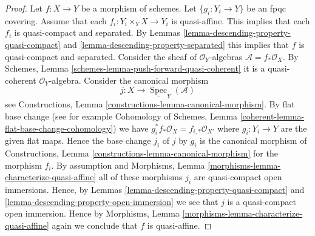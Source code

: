 \documentclass{stacks-project}
\theoremstyle{plain}
\theoremstyle{definition}
\theoremstyle{remark}
\numberwithin{equation}{subsection}
\def\Spec{\mathop{\mathrm{Spec}}}
\begin{document}
\begin{proof}
Let $f : X \to Y$ be a morphism of schemes.
Let $\{g_i : Y_i \to Y\}$ be an fpqc covering.
Assume that each $f_i : Y_i \times_Y X \to Y_i$
is quasi-affine.
This implies that each $f_i$ is quasi-compact and separated.
By Lemmas \ref{lemma-descending-property-quasi-compact}
and \ref{lemma-descending-property-separated}
this implies that $f$ is quasi-compact and separated.
Consider the sheaf of $\mathcal{O}_Y$-algebras
$\mathcal{A} = f_*\mathcal{O}_X$.
By Schemes, Lemma \ref{schemes-lemma-push-forward-quasi-coherent}
it is a quasi-coherent $\mathcal{O}_Y$-algebra.
Consider the canonical morphism
$$
j : X \longrightarrow \underline{\Spec}_Y(\mathcal{A})
$$
see Constructions, Lemma \ref{constructions-lemma-canonical-morphism}.
By flat base change
(see for example
Cohomology of Schemes, Lemma \ref{coherent-lemma-flat-base-change-cohomology})
we have $g_i^*f_*\mathcal{O}_X = f_{i, *}\mathcal{O}_{X'}$
where $g_i : Y_i \to Y$ are the given flat
maps. Hence the base change $j_i$ of $j$ by $g_i$ is the canonical
morphism of Constructions, Lemma \ref{constructions-lemma-canonical-morphism}
for the morphism $f_i$. By assumption and
Morphisms, Lemma \ref{morphisms-lemma-characterize-quasi-affine}
all of these
morphisms $j_i$ are quasi-compact open immersions. Hence, by
Lemmas \ref{lemma-descending-property-quasi-compact} and
\ref{lemma-descending-property-open-immersion} we
see that $j$ is a quasi-compact open immersion.
Hence by
Morphisms, Lemma \ref{morphisms-lemma-characterize-quasi-affine}
again we conclude that $f$ is quasi-affine.
\end{proof}
\end{document}
